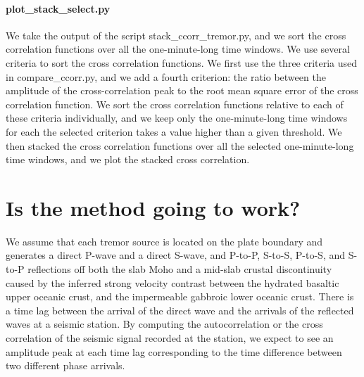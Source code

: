 \documentclass[workdone.tex]{subfiles}
\begin{document}
\paragraph{plot_stack_select.py} We take the output of the script stack\_ccorr\_tremor.py, and we sort the cross correlation functions over all the one-minute-long time windows. We use several criteria to sort the cross correlation functions. We first use the three criteria used in compare\_ccorr.py, and we add a fourth criterion: the ratio between the amplitude of the cross-correlation peak to the root mean square error of the cross correlation function. We sort the cross correlation functions relative to each of these criteria individually, and we keep only the one-minute-long time windows for each the selected criterion takes a value higher than a given threshold. We then stacked the cross correlation functions over all the selected one-minute-long time windows, and we plot the stacked cross correlation.

%
%

\section{Is the method going to work?}

We assume that each tremor source is located on the plate boundary and generates a direct P-wave and a direct S-wave, and P-to-P, S-to-S, P-to-S, and S-to-P reflections off both the slab Moho and a mid-slab crustal discontinuity caused by the inferred strong velocity contrast between the hydrated basaltic upper oceanic crust, and the impermeable gabbroic lower oceanic crust. There is a time lag between the arrival of the direct wave and the arrivals of the reflected waves at a seismic station. By computing the autocorrelation or the cross correlation of the seismic signal recorded at the station, we expect to see an amplitude peak at each time lag corresponding to the time difference between two different phase arrivals. \\
\end{document}
